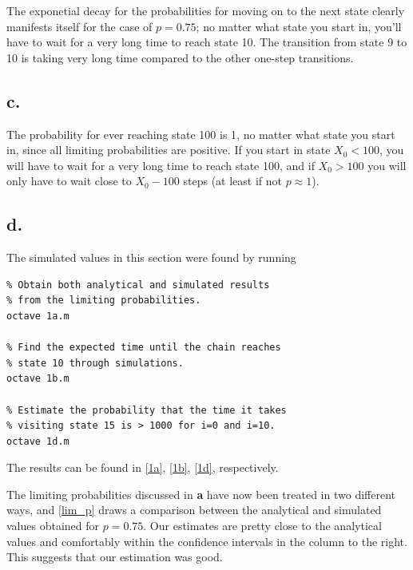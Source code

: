 The exponetial decay for the probabilities for moving on to the next state  clearly manifests itself for the case of $p=0.75$; no matter what state you start in, you'll have to wait for a very long time to reach state 10. The transition from state 9 to 10 is taking very long time compared to the other one-step transitions. 


\subsection*{c.}

The probability for ever reaching state 100 is 1, no matter what state you start in, since all limiting probabilities are positive. If you start in state $X_0<100$, you will have to wait for a very long time to reach state 100, and if $X_0>100$ you will only have to wait close to $X_0 - 100$ steps (at least if not $p \approx 1$).


\subsection*{d.}


The simulated values in this section were found by running

\begin{verbatim}
% Obtain both analytical and simulated results
% from the limiting probabilities. 
octave 1a.m

% Find the expected time until the chain reaches
% state 10 through simulations.
octave 1b.m

% Estimate the probability that the time it takes 
% visiting state 15 is > 1000 for i=0 and i=10.
octave 1d.m
\end{verbatim}

The results can be found in \cref{1a}, \cref{1b}, \cref{1d}, respectively.

The limiting probabilities discussed in \textbf{a} have now been treated in two different ways, and \cref{lim_p} draws a comparison between the analytical and simulated values obtained for $p=0.75$. Our estimates are pretty close to the analytical values and comfortably within the confidence intervals in the column to the right. This suggests that our estimation was good.



